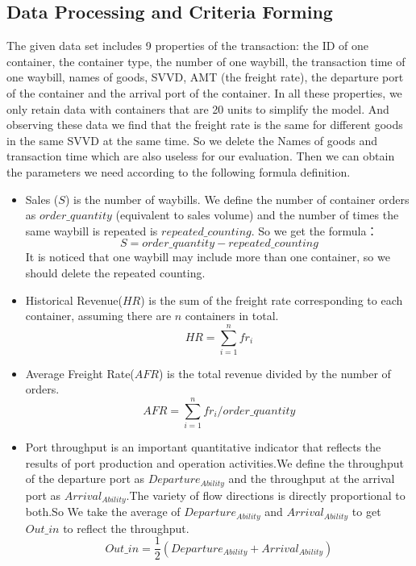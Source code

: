 \subsection{Data Processing and Criteria Forming}
The given data set includes 9 properties of the transaction: the ID of one container, the container type, the number of one waybill, the transaction time of one waybill, names of goods, SVVD, AMT (the freight rate), the departure port of the container and the arrival port of the container. In all these properties, we only retain data with containers that are 20 units to simplify the model. And observing these data we find that the freight rate is the same for different goods in the same SVVD at the same time. So we delete the Names of goods and transaction time which are also useless for our evaluation. Then we can obtain the parameters we need according to the following formula definition. 
\begin{itemize}              
    \item Sales ($S$) is the number of waybills. We define the number of container orders as $order\_{quantity}$ (equivalent to sales volume) and the number of times the same waybill is repeated is $repeated\_{counting}$. So we get the formula：
        \begin{equation*}
            S = order\_{quantity} - repeated\_{counting}
        \end{equation*}
   It is noticed that one waybill may include more than one container, so we should delete the repeated counting.
    \item Historical Revenue($HR$) is the sum of the freight rate corresponding to each container, assuming there are $n$ containers in total.
        \begin{equation*}
            HR = \sum_{i=1}^n fr_i
        \end{equation*}
    \item Average Freight Rate($AFR$) is the total revenue divided by the number of orders.
        \begin{equation*}
            AFR = \sum_{i=1}^n fr_i / order\_{quantity}
        \end{equation*}
    \item Port throughput is an important quantitative indicator that reflects the results of port production and operation activities.We define the throughput of the departure port as $Departure_{Ability}$ and the throughput at the arrival port as $Arrival_{Ability}$.The variety of flow directions is directly proportional to both.So We take the average of $Departure_{Ability}$ and $Arrival_{Ability}$ to get $Out\_{in}$ to reflect the throughput.
        \begin{equation*}
            Out\_{in} = \frac{1}{2} (Departure_{Ability} + Arrival_{Ability})
        \end{equation*}
   
\end{itemize}

